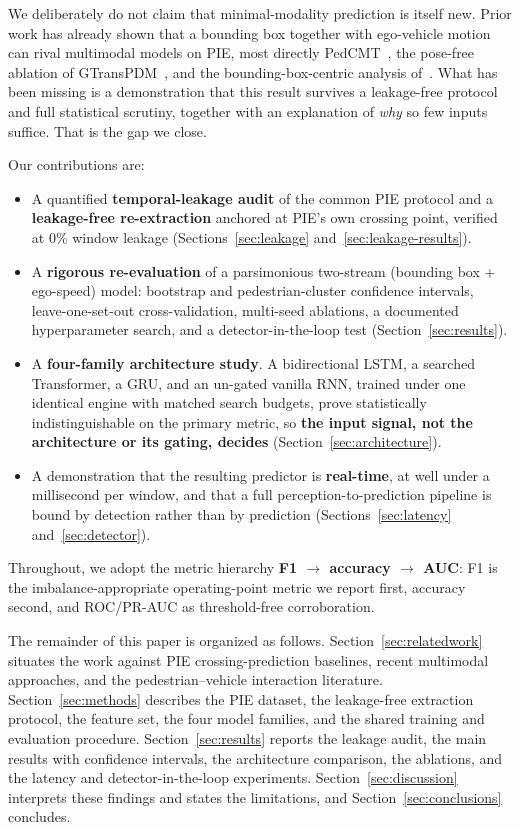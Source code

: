 \documentclass[mti,article,submit,moreauthors]{Definitions/mdpi}
\begin{document}
We deliberately do not claim that minimal-modality prediction is itself new. Prior work has already shown that a bounding box together with ego-vehicle motion can rival multimodal models on PIE, most directly PedCMT~\citep{chen2024pedcmt}, the pose-free ablation of GTransPDM~\citep{xie2025gtranspdm}, and the bounding-box-centric analysis of~\citet{achaji2022attention}. What has been missing is a demonstration that this result survives a leakage-free protocol and full statistical scrutiny, together with an explanation of \emph{why} so few inputs suffice. That is the gap we close.

Our contributions are:
\begin{itemize}
\item A quantified \textbf{temporal-leakage audit} of the common PIE protocol and a \textbf{leakage-free re-extraction} anchored at PIE's own crossing point, verified at 0\% window leakage (Sections~\ref{sec:leakage} and~\ref{sec:leakage-results}).
\item A \textbf{rigorous re-evaluation} of a parsimonious two-stream (bounding box + ego-speed) model: bootstrap and pedestrian-cluster confidence intervals, leave-one-set-out cross-validation, multi-seed ablations, a documented hyperparameter search, and a detector-in-the-loop test (Section~\ref{sec:results}).
\item A \textbf{four-family architecture study}. A bidirectional LSTM, a searched Transformer, a GRU, and an un-gated vanilla RNN, trained under one identical engine with matched search budgets, prove statistically indistinguishable on the primary metric, so \textbf{the input signal, not the architecture or its gating, decides} (Section~\ref{sec:architecture}).
\item A demonstration that the resulting predictor is \textbf{real-time}, at well under a millisecond per window, and that a full perception-to-prediction pipeline is bound by detection rather than by prediction (Sections~\ref{sec:latency} and~\ref{sec:detector}).
\end{itemize}

Throughout, we adopt the metric hierarchy \textbf{F1 $\rightarrow$ accuracy $\rightarrow$ AUC}: F1 is the imbalance-appropriate operating-point metric we report first, accuracy second, and ROC/PR-AUC as threshold-free corroboration.

The remainder of this paper is organized as follows. Section~\ref{sec:relatedwork} situates the work against PIE crossing-prediction baselines, recent multimodal approaches, and the pedestrian--vehicle interaction literature. Section~\ref{sec:methods} describes the PIE dataset, the leakage-free extraction protocol, the feature set, the four model families, and the shared training and evaluation procedure. Section~\ref{sec:results} reports the leakage audit, the main results with confidence intervals, the architecture comparison, the ablations, and the latency and detector-in-the-loop experiments. Section~\ref{sec:discussion} interprets these findings and states the limitations, and Section~\ref{sec:conclusions} concludes.
\end{document}
